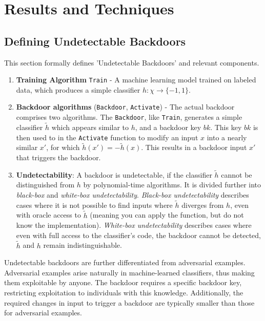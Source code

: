 \documentclass[
	fontsize=12pt,
	headings=small,
	parskip=quarter,
	bibliography=totoc,
	numbers=noenddot,       
	open=any,               
 	final                   
]{scrreprt}
\begin{document}
{\let\clearpage\relax \chapter{Results and Techniques}}
\section{Defining Undetectable Backdoors}
This section formally defines 'Undetectable Backdoors' and relevant components.
\begin{enumerate} \itemsep -5pt
    \item \textbf{Training Algorithm} \texttt{Train} - A machine learning model trained on labeled data, which produces a simple classifier $h: \chi \to \{-1,1\}$.
    \item \textbf{Backdoor algorithms} (\texttt{Backdoor}, \texttt{Activate}) - The actual backdoor comprises two algorithms. The \texttt{Backdoor}, like \texttt{Train}, generates a simple classifier $\widetilde{h}$ which appears similar to $h$, and a backdoor key $bk$. This key $bk$ is then used to in the \texttt{Activate} function to modify an input $x$ into a nearly similar $x'$, for which $\widetilde{h}(x')=-\widetilde{h}(x)$. This results in a backdoor input $x'$ that triggers the backdoor.
    \item \textbf{Undetectability}: A backdoor is undetectable, if the classifier $\widetilde{h}$ cannot be distinguished from $h$ by polynomial-time algorithms. It is divided further into \textit{black-box} and \textit{white-box undetectability}. \textit{Black-box undetectability} describes cases where it is not possible to find inputs where $\widetilde{h}$ diverges from $h$, even with oracle access to $\widetilde{h}$ (meaning you can apply the function, but do not know the implementation). \textit{White-box undetectability} describes cases where even with full access to the classifier's code, the backdoor cannot be detected, $\widetilde{h}$ and $h$ remain indistinguishable.
\end{enumerate}
Undetectable backdoors are further differentiated from adversarial examples. Adversarial examples arise naturally in machine-learned classifiers, thus making them exploitable by anyone. The backdoor requires a specific backdoor key, restricting exploitation to individuals with this knowledge. Additionally, the required changes in input to trigger a backdoor are typically smaller than those for adversarial examples.
\end{document}
